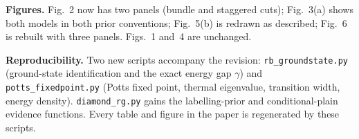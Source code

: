 \documentclass[11pt]{article}
\begin{document}
\textbf{Figures.} Fig.~2 now has two panels (bundle and staggered cuts);
Fig.~3(a) shows both models in both prior conventions; Fig.~5(b) is redrawn as
described; Fig.~6 is rebuilt with three panels. Figs.~1 and~4 are unchanged.

\textbf{Reproducibility.} Two new scripts accompany the revision:
\texttt{rb\_groundstate.py} (ground-state identification and the exact energy
gap $\gamma$) and \texttt{potts\_fixedpoint.py} (Potts fixed point, thermal
eigenvalue, transition width, energy density). \texttt{diamond\_rg.py} gains
the labelling-prior and conditional-plain evidence functions. Every table and
figure in the paper is regenerated by these scripts.
\end{document}
